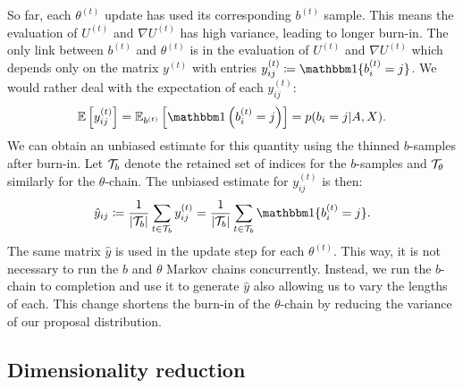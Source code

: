 So far, each $\theta^{(t)}$ update has used its corresponding $b^{(t)}$ sample. This means the evaluation of $U^{(t)}$ and $\nabla U^{(t)}$ has high variance, leading to longer burn-in. The only link between $b^{(t)}$ and $\theta^{(t)}$ is in the evaluation of $U^{(t)}$ and $\nabla U^{(t)}$ which depends only on the matrix $y^{(t)}$ with entries $y_{ij}^{(t)} \coloneqq \one\{b_i^{(t)} = j\}$. We would rather deal with the expectation of each $y_{ij}^{(t)}$:
%
\begin{equation}
	\Expect \left[ y_{ij}^{(t)} \right] = \Expect_{b^{(t)}} \left[ \one \left( b_{i}^{(t)} = j \right) \right]
	= p(b_i = j | A, X).
\end{equation}
%
We can obtain an unbiased estimate for this quantity using 
the thinned $b$-samples after burn-in.
Let $\mathcal{T}_b$  denote the retained set of indices 
for the $b$-samples and $\mathcal{T}_\theta$ similarly for the $\theta$-chain. 
The unbiased estimate for $y_{ij}^{(t)}$ is then:
%
\begin{equation}
	\hat{y}_{ij} \coloneqq \frac{1}{|\Tcal_b|} \sum_{t \in \Tcal_b} y_{ij}^{(t)} = \frac{1}{|\Tcal_b|} \sum_{t \in \Tcal_b} \one\{b_i^{(t)} = j\}.
	\label{eqn:y-hat}
\end{equation}
%
The same matrix $\hat{y}$ is used in the update step
for each $\theta^{(t)}$.
This way, it is not necessary to run the $b$ and $\theta$ Markov chains 
concurrently. Instead, we run the $b$-chain to completion and use it 
to generate $\hat{y}$ also allowing us to vary the lengths of each. This change shortens the burn-in of the $\theta$-chain by reducing the variance of our proposal distribution.

\subsection{Dimensionality reduction}
\label{sec:dim-reduction}

